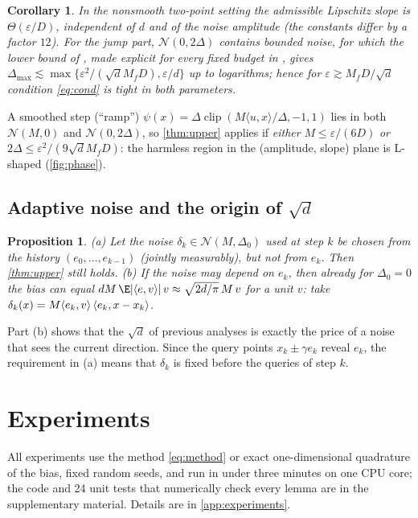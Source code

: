\documentclass{article} %
\renewcommand{\eps}{\varepsilon}
\newcommand{\cN}{\mathcal{N}}
\newcommand{\ip}[2]{\langle #1,#2\rangle}
\let\sign\relax\DeclareMathOperator{\sign}{sign}
\DeclareMathOperator{\clip}{clip}
\theoremstyle{plain}
\newtheorem{proposition}{Proposition}
\newtheorem{corollary}{Corollary}
\theoremstyle{definition}
\theoremstyle{remark}
\begin{document}
\begin{corollary}\label{cor:tight}
In the nonsmooth two-point setting the admissible Lipschitz slope is $\Theta(\eps/D)$, independent of $d$ and of the noise amplitude (the constants differ by a factor $12$). For the jump part, $\cN(0,2\Delta)$ contains bounded noise, for which the lower bound of \citet{risteski2016algorithms}, made explicit for every fixed budget in \citet[Thm.~III.1]{pasechnyuk2023upper}, gives $\Delta_{\max}\lesssim\max\{\eps^2/(\sqrt dM_fD),\eps/d\}$ up to logarithms; hence for $\eps\gtrsim M_fD/\sqrt d$ condition \eqref{eq:cond} is tight in both parameters.
\end{corollary}

A smoothed step (``ramp'') $\psi(x)=\Delta\clip(M\ip ux/\Delta,-1,1)$ lies in both $\cN(M,0)$ and $\cN(0,2\Delta)$, so \cref{thm:upper} applies if \emph{either} $M\le\eps/(6D)$ \emph{or} $2\Delta\le\eps^2/(9\sqrt dM_fD)$: the harmless region in the (amplitude, slope) plane is L-shaped (\cref{fig:phase}).

\subsection{Adaptive noise and the origin of $\sqrt d$}

\begin{proposition}\label{prop:adaptive}
(a) Let the noise $\delta_k\in\cN(M,\Delta_0)$ used at step $k$ be chosen from the history $(e_0,\dots,e_{k-1})$ (jointly measurably), but not from $e_k$. Then \cref{thm:upper} still holds.
(b) If the noise may depend on $e_k$, then already for $\Delta_0=0$ the bias can equal $dM\,\E|\ip ev|\,v\approx\sqrt{2d/\pi}\,M\,v$ for a unit $v$: take $\delta_k(x)=M\sign\ip{e_k}v\,\ip{e_k}{x-x_k}$.
\end{proposition}

Part (b) shows that the $\sqrt d$ of previous analyses is exactly the price of a noise that sees the current direction. Since the query points $x_k\pm\gamma e_k$ reveal $e_k$, the requirement in (a) means that $\delta_k$ is fixed before the queries of step $k$.

\section{Experiments}\label{sec:experiments}

All experiments use the method \eqref{eq:method} or exact one-dimensional quadrature of the bias, fixed random seeds, and run in under three minutes on one CPU core; the code and 24 unit tests that numerically check every lemma are in the supplementary material. Details are in \cref{app:experiments}.
\end{document}
